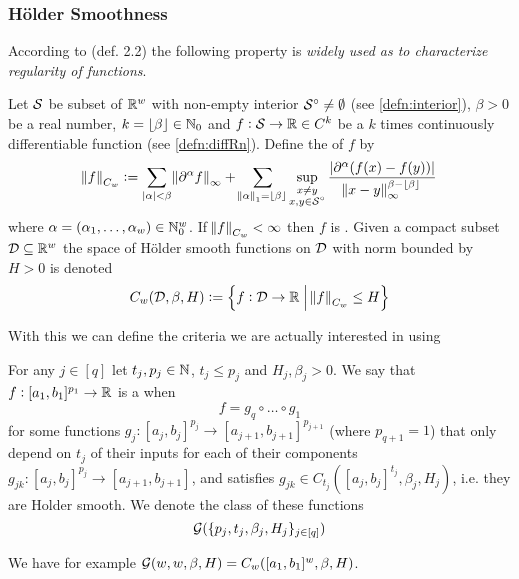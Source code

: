 \subsubsection{Hölder Smoothness}
According to  (def. 2.2) the following property is
\emph{widely used as to characterize regularity of functions}.
\begin{defn}
  Let $\mathcal{S}$ be subset of $\mathbb{R}^w$ with non-empty interior
  $\mathcal{S}^\circ \neq \emptyset$
  (see \cref{defn:interior}),
  $\beta > 0$ be a real number, $k = \lfloor\beta\rfloor \in \mathbb{N}_0$
  and $f : \mathcal{S} \to \mathbb{R} \in C^k$ be a $k$ times continuously
  differentiable function (see \cref{defn:diffRn}). Define
  the  of $f$ by
  \begin{equation}
    \norm{f}_{C_w} \vcentcolon= 
    \sum_{|{\alpha}| < \beta}
    \norm{\partial^{\alpha}f}_\infty +
    \sum_{\norm{{\alpha}}_1 = \lfloor\beta\rfloor}
    \sup_{\substack{x \neq y \\ x, y \in \mathcal{S}^\circ}}
    \frac{|\partial^\alpha (f(x) - f(y))|}
  {\norm{x-y}_\infty^{\beta-\lfloor\beta\rfloor}}
  \end{equation}
  where $\alpha = (\alpha_1, \dots, \alpha_w) \in \mathbb{N}_0^w$.
  If $\norm{f}_{C_w} < \infty$ then $f$ is .
  Given a compact subset $\mathcal{D} \subseteq \mathbb{R}^w$
  the space of Hölder smooth functions on $\mathcal{D}$ with norm bounded by
  $H > 0$ is denoted
  \[ C_w(\mathcal{D}, \beta, H) \vcentcolon=
  \left\{ f : \mathcal{D} \to \mathbb{R} \;\middle\vert\; \norm{f}_{C_w} \leq H \right\} \]
  \label{defn:holdersmooth}
\end{defn}

With this we can define the criteria we are actually interested in
using

\begin{defn}
  For any $j \in [q]$ let $t_j, p_j \in \mathbb{N}$, $t_j\leq p_j$ and $H_j, \beta_j > 0$.
  We say that $f:[a_1, b_1]^{p_1} \to \mathbb{R}$
  is a  when
  \[ f = g_q \circ \dots \circ g_1 \]
  for some functions $g_j : [a_j, b_j]^{p_j} \to [a_{j+1}, b_{j+1}]^{p_{j+1}}$
  (where $p_{q+1} = 1$)
  that only depend on $t_j$ of their inputs
  for each of their components $g_{jk}:[a_j, b_j]^{p_j} \to [a_{j+1}, b_{j+1}]$,
  and satisfies $g_{jk} \in C_{t_j}([a_j, b_j]^{t_j}, \beta_j, H_j)$, 
  i.e. they are Holder smooth.
  We denote the class of these functions
  \[ \mathcal{G}(\{p_j, t_j, \beta_j, H_j\}_{j \in [q]}) \]
\end{defn}

\begin{example}
  We have for example $\mathcal{G}(w, w, \beta, H) = C_w([a_1, b_1]^w, \beta, H)$.
\end{example}

